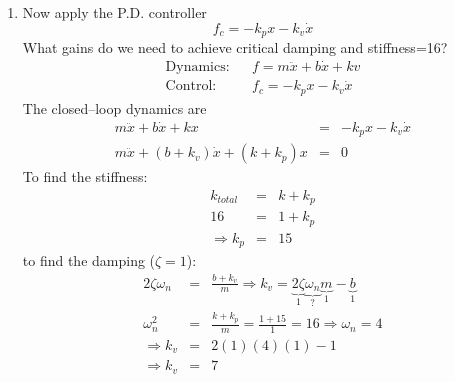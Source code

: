 \documentclass[]{article}
\begin{document}
\begin{enumerate}
\item Now apply the P.D. controller
\begin{displaymath}
 f_{c} = -k_{p}x-k_{v}\dot{x}
\end{displaymath}
What gains do we need to achieve critical damping and stiffness=16?
\begin{eqnarray}
 \text{Dynamics:} && f = m\ddot{x}+b\dot{x}+kv \nonumber \\
 \text{Control:} && f_{c} = -k_{p}x - k_{v}\dot{x} \nonumber
\end{eqnarray}
The closed--loop dynamics are
\begin{eqnarray}
 m\ddot{x}+b\dot{x}+kx & = & -k_{p}x-k_{v}\dot{x} \nonumber \\
 m\ddot{x} + (b+k_{v})\dot{x} + (k+k_{p})x & = & 0 \nonumber
\end{eqnarray}
To find the stiffness:
\begin{eqnarray}
k_{total} & = & k+k_{p} \nonumber \\
16 & = & 1 + k_{p} \nonumber \\
\Rightarrow k_{p} & = & 15 \nonumber
\end{eqnarray}
to find the damping ($\zeta=1$):
\begin{eqnarray}
 2\zeta\omega_{n} & = & \frac{b+k_{v}}{m} \Rightarrow k_{v} = \underbrace{2\zeta}_{1}\underbrace{\omega_{n}}_{?}\underbrace{m}_{1} - \underbrace{b}_{1} \nonumber \\
 \omega_{n}^{2} & = & \frac{k+k_{p}}{m} = \frac{1+15}{1}=16\Rightarrow \omega_{n}=4 \nonumber \\
 \Rightarrow k_{v} & = & 2(1)(4)(1)-1 \nonumber \\
 \Rightarrow k_{v} & = & 7 \nonumber 
\end{eqnarray}


\end{enumerate}
\end{document}
